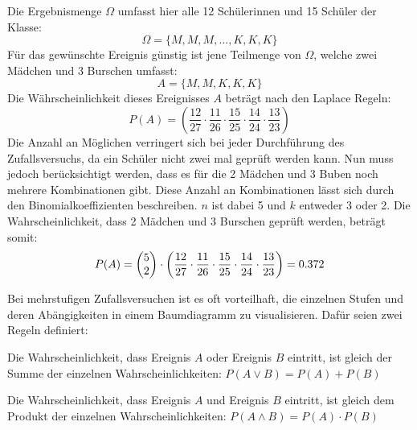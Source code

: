 Die Ergebnismenge $\Omega$ umfasst hier alle 12 Sch\"{u}lerinnen und 15 Sch\"{u}ler der Klasse: $$\Omega = \{M, M, M, \dots, K, K, K\}$$ F\"{u}r das gew\"{u}nschte Ereignis g\"{u}nstig ist jene Teilmenge von $\Omega$, welche zwei M\"{a}dchen und 3 Burschen umfasst: $$A = \{ M, M, K, K, K\}$$ Die W\"{a}hrscheinlichkeit dieses Ereignisses $A$ betr\"{a}gt nach den Laplace Regeln: $$P(A) = \left(\frac{12}{27} \cdot \frac{11}{26} \cdot \frac{15}{25} \cdot \frac{14}{24} \cdot \frac{13}{23}\right)$$ Die Anzahl an M\"{o}glichen verringert sich bei jeder Durchf\"{u}hrung des Zufallsversuchs, da ein Sch\"{u}ler nicht zwei mal gepr\"{u}ft werden kann. Nun muss jedoch ber\"{u}cksichtigt werden, dass es f\"{u}r die 2 M\"{a}dchen und 3 Buben noch mehrere Kombinationen gibt. Diese Anzahl an Kombinationen l\"{a}sst sich durch den Binomialkoeffizienten beschreiben. $n$ ist dabei 5 und $k$ entweder 3 oder 2. Die Wahrscheinlichkeit, dass 2 M\"{a}dchen und 3 Burschen gepr\"{u}ft werden, betr\"{a}gt somit: $$P(A) = \begin{pmatrix}5 \\ 2\end{pmatrix} \cdot \left(\frac{12}{27} \cdot \frac{11}{26} \cdot \frac{15}{25} \cdot \frac{14}{24} \cdot \frac{13}{23}\right) = 0.372$$

\pagebreak


Bei mehrstufigen Zufallsversuchen ist es oft vorteilhaft, die einzelnen Stufen und deren Ab\"{a}ngigkeiten in einem Baumdiagramm zu visualisieren. Daf\"{u}r seien zwei Regeln definiert:

\begin{enumerate}
	 Die Wahrscheinlichkeit, dass Ereignis $A$ oder Ereignis $B$ eintritt, ist gleich der Summe der einzelnen Wahrscheinlichkeiten: $P(A \lor B) = P(A) + P(B)$

	 Die Wahrscheinlichkeit, dass Ereignis $A$ und Ereignis $B$ eintritt, ist gleich dem Produkt der einzelnen Wahrscheinlichkeiten: $P(A \land B) = P(A) \cdot P(B)$
\end{enumerate}



